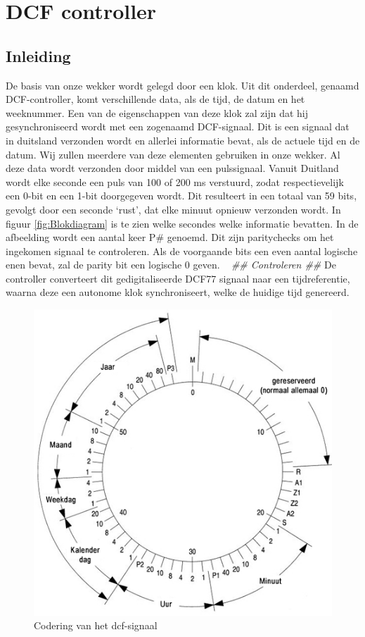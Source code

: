 \chapter{DCF controller}
\section{Inleiding}
De basis van onze wekker wordt gelegd door een klok. Uit dit onderdeel, genaamd DCF-controller,  komt verschillende data, als de tijd, de datum en het weeknummer. Een van de eigenschappen van deze klok zal zijn dat hij gesynchroniseerd wordt met een zogenaamd DCF-signaal. Dit is een signaal dat in duitsland verzonden wordt en allerlei informatie bevat, als de actuele tijd en de datum. Wij zullen meerdere van deze elementen gebruiken in onze wekker.  Al deze data wordt verzonden door middel van een pulssignaal. Vanuit Duitland wordt elke seconde een puls van 100 of 200 ms verstuurd, zodat respectievelijk een 0-bit en een 1-bit doorgegeven wordt. Dit resulteert in een totaal van 59 bits, gevolgt door een seconde ‘rust’, dat elke minuut opnieuw verzonden wordt. In figuur \ref{fig:Blokdiagram} is te zien welke secondes welke informatie bevatten. In de afbeelding wordt een aantal keer P\# genoemd. Dit zijn paritychecks om het ingekomen signaal te controleren. Als de voorgaande bits een even aantal logische enen bevat, zal de parity bit een logische 0 geven. ~\cite{Tijdscodering} \emph{\color{red} \#\# Controleren \#\#} De controller converteert dit gedigitaliseerde DCF77 signaal naar een tijdreferentie, waarna deze een autonome klok synchroniseert, welke de huidige tijd genereerd.

\begin{figure}[h!]
\center
\includegraphics[scale=2]{Figuren/DCF77/dcf77coding.png}
\caption{Codering van het dcf-signaal~\cite{Tijdscodering}}
\label{fig:dcfsignaal}
\end{figure}

